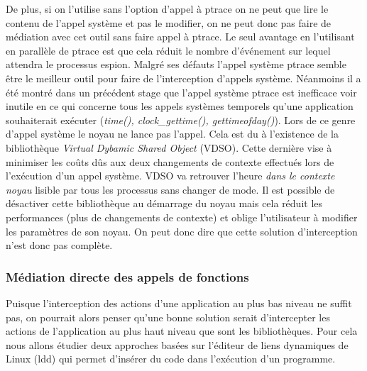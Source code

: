 De plus, si on l'utilise sans l'option d'appel à ptrace on ne peut que lire le
contenu de l'appel système et pas le modifier, on ne peut donc pas faire de
médiation avec cet outil sans faire appel à ptrace. Le seul avantage en
l'utilisant en parallèle de ptrace est que cela réduit le nombre d'événement sur
lequel attendra le processus espion.
\newline
Malgré ses défauts l'appel système ptrace semble être le meilleur outil pour
faire de l'interception d'appels système. Néanmoins il a été montré dans un
précédent stage \cite{INTERCEPTION:MARION} que l'appel système ptrace est
inefficace voir inutile en ce qui concerne tous les appels systèmes temporels
qu'une application souhaiterait exécuter (\textit{time(), clock\_gettime(),
  gettimeofday()}). Lors de ce genre d'appel système le noyau ne lance pas
l'appel. Cela est du à l'existence de la bibliothèque \textit{Virtual Dybamic
  Shared Object} (VDSO). Cette dernière vise à minimiser les coûts dûs aux deux
changements de contexte effectués lors de l'exécution d'un appel système. VDSO
va retrouver l'heure \textit{{\color{red}dans le contexte noyau}} lisible par tous les
processus sans changer de mode. Il est possible de désactiver cette bibliothèque
au démarrage du noyau mais cela réduit les performances (plus de changements de
contexte) et oblige l'utilisateur à modifier les paramètres de son noyau. On
peut donc dire que cette solution d'interception n'est donc pas complète.


\subsubsection{Médiation directe des appels de fonctions}

Puisque l'interception des actions d'une application au plus bas niveau ne
suffit pas, on pourrait alors penser qu'une bonne solution serait d'intercepter
les actions de l'application au plus haut niveau que sont les
bibliothèques. Pour cela nous allons étudier deux approches basées sur l'éditeur
de liens dynamiques de Linux (ldd) qui permet d'insérer du code dans l'exécution
d'un programme.

